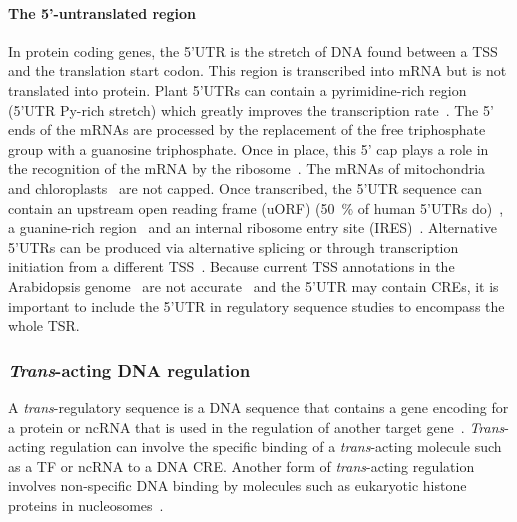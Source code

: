 \documentclass[../main.tex]{subfiles}
\begin{document}
\paragraph{The 5'-untranslated region}\label{chapter1:the-5-untranslated-region}

In protein coding genes, the 5'UTR is the stretch of DNA found between a
TSS and the translation start codon. This region is transcribed into
mRNA but is not translated into protein. Plant 5'UTRs can contain a
pyrimidine\hyp{}rich region (5'UTR Py\hyp{}rich stretch) which greatly improves
the transcription rate~\autocite{choudhuryComparativeStudyCultivar2009,duIsolationFunctionalCharacterization2010,bianCloningExpressionCharacterization2011}.
The 5' ends of the mRNAs are
processed by the replacement of the free triphosphate group with a
guanosine triphosphate. Once in place, this 5' cap plays a role in the
recognition of the mRNA by the ribosome~\autocite{byszewskaRNAMethyltransferasesInvolved2014,ramanathanMRNACappingBiological2016}. The mRNAs of
mitochondria~\autocite{temperleyHumanMitochondrialMRNAs2010} and chloroplasts~\autocite{mondeProcessingDegradationChloroplast2000} are
not capped. Once transcribed, the 5'UTR sequence can contain an upstream
open reading frame (uORF) (\SI{50}{\percent} of human 5'UTRs do)~\autocite{calvoUpstreamOpenReading2009},
a guanine\hyp{}rich region~\autocite{beaudoinUTRGquadruplexStructures2010} and an internal ribosome entry
site (IRES)~\autocite{jimenez-gonzalezFunctionalStructuralAnalysis2014}.
Alternative 5'UTRs can be produced via alternative splicing or through
transcription initiation from a different TSS~\autocite{smithPosttranscriptionalRegulationGene2008}.
Because current TSS annotations in the Arabidopsis genome~\autocite{lameschArabidopsisInformationResource2012} are not accurate~\autocite{mortonPairedEndAnalysisTranscription2014,thieffryCharacterizationArabidopsisThaliana2020} and the 5'UTR may contain CREs, it is important to include the 5'UTR in regulatory sequence studies to encompass the whole TSR.

\subsubsection{\textit{Trans}-acting DNA regulation}\label{chapter1:trans-acting-dna-regulation}

A \textit{trans}\hyp{}regulatory sequence is a DNA sequence that contains a
gene encoding for a protein or ncRNA that is used in the regulation of
another target gene~\autocite{watsonRecombinantDNAGenes2007}. \textit{Trans}\hyp{}acting regulation
can involve the specific binding of a \textit{trans}\hyp{}acting molecule such
as a TF or ncRNA to a DNA CRE. Another form of \textit{trans}\hyp{}acting
regulation involves non\hyp{}specific DNA binding by molecules such as
eukaryotic histone proteins in nucleosomes~\autocite{zhangIntrinsicHistoneDNAInteractions2009}.
\end{document}

